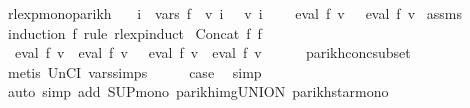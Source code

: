 \begin{isabellebody}
%
\isadelimproof
\isanewline
%
\endisadelimproof
\isanewline
{}\isamarkupfalse%
\ rlexp{\isacharunderscore}{\kern0pt}mono{\isacharunderscore}{\kern0pt}parikh{\isacharcolon}{\kern0pt}\isanewline
\ \ \ {\isachardoublequoteopen}{\isasymforall}i\ {\isasymin}\ vars\ f{\isachardot}{\kern0pt}\ {\isasymPsi}\ {\isacharparenleft}{\kern0pt}v\ i{\isacharparenright}{\kern0pt}\ {\isasymsubseteq}\ {\isasymPsi}\ {\isacharparenleft}{\kern0pt}v{\isacharprime}{\kern0pt}\ i{\isacharparenright}{\kern0pt}{\isachardoublequoteclose}\isanewline
\ \ \ {\isachardoublequoteopen}{\isasymPsi}\ {\isacharparenleft}{\kern0pt}eval\ f\ v{\isacharparenright}{\kern0pt}\ {\isasymsubseteq}\ {\isasymPsi}\ {\isacharparenleft}{\kern0pt}eval\ f\ v{\isacharprime}{\kern0pt}{\isacharparenright}{\kern0pt}{\isachardoublequoteclose}\isanewline
%
\isadelimproof
%
\endisadelimproof
%
\isatagproof
{}\isamarkupfalse%
\ assms\ \isamarkupfalse%
\ {\isacharparenleft}{\kern0pt}induction\ f\ rule{\isacharcolon}{\kern0pt}\ rlexp{\isachardot}{\kern0pt}induct{\isacharparenright}{\kern0pt}\isanewline
{}\isamarkupfalse%
\ {\isacharparenleft}{\kern0pt}Concat\ f{}\ f{}{\isacharparenright}{\kern0pt}\isanewline
\ \ \isamarkupfalse%
\ \isamarkupfalse%
\ {\isachardoublequoteopen}{\isasymPsi}\ {\isacharparenleft}{\kern0pt}eval\ f{}\ v\ {\isacharat}{\kern0pt}{\isacharat}{\kern0pt}\ eval\ f{}\ v{\isacharparenright}{\kern0pt}\ {\isasymsubseteq}\ {\isasymPsi}\ {\isacharparenleft}{\kern0pt}eval\ f{}\ v{\isacharprime}{\kern0pt}\ {\isacharat}{\kern0pt}{\isacharat}{\kern0pt}\ eval\ f{}\ v{\isacharprime}{\kern0pt}{\isacharparenright}{\kern0pt}{\isachardoublequoteclose}\isanewline
\ \ \ \ \isamarkupfalse%
\ parikh{\isacharunderscore}{\kern0pt}conc{\isacharunderscore}{\kern0pt}subset\ \isamarkupfalse%
\ {\isacharparenleft}{\kern0pt}metis\ UnCI\ vars{\isachardot}{\kern0pt}simps{\isacharparenleft}{\kern0pt}{}{\isacharparenright}{\kern0pt}{\isacharparenright}{\kern0pt}\isanewline
\ \ \isamarkupfalse%
\ \isamarkupfalse%
\ {\isacharquery}{\kern0pt}case\ \isamarkupfalse%
\ simp\isanewline
{}\isamarkupfalse%
\ {\isacharparenleft}{\kern0pt}auto\ simp\ add{\isacharcolon}{\kern0pt}\ SUP{\isacharunderscore}{\kern0pt}mono{\isacharprime}{\kern0pt}\ parikh{\isacharunderscore}{\kern0pt}img{\isacharunderscore}{\kern0pt}UNION\ parikh{\isacharunderscore}{\kern0pt}star{\isacharunderscore}{\kern0pt}mono{\isacharparenright}{\kern0pt}%

\end{isabellebody}
